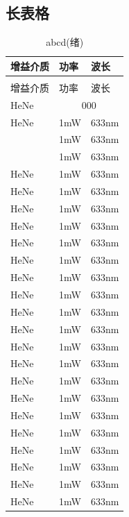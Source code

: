 \documentclass{cumcmthesis}
\begin{document}
\begin{appendices}
\section{长表格}
\begin{longtable}[c]{p{}<{\centering}|p{}<{\centering}p{}<{\centering}}
    \caption{abcd} \\
    \toprule[2pt]
    增益介质&功率& 波长\\ 
    \midrule[1pt]
    \endfirsthead
    \caption[]{abcd(绪)} \\
    \toprule[2pt]
    增益介质&功率&波长\\ 
    \midrule[1pt]
    \endhead
    \bottomrule[1.5pt] 
    \endfoot
    \bottomrule[1.5pt]
    \endlastfoot
    HeNe & \multicolumn{2}{c}{000} \\
    HeNe & 1mW & 633nm \\\cline{1-2} 
    \multirow{2}{0.2\textwidth}{\centering000}
     & 1mW & 633nm \\
     & 1mW & 633nm \\
    HeNe & 1mW & 633nm \\
    HeNe & 1mW & 633nm \\
    HeNe & 1mW &  633nm \\
    HeNe & 1mW & 633nm \\
    HeNe & 1mW & 633nm \\
    HeNe & 1mW & 633nm \\
    HeNe & 1mW & 633nm \\
    HeNe & 1mW & 633nm \\
    HeNe & 1mW & 633nm \\
    HeNe & 1mW & 633nm \\
    HeNe & 1mW & 633nm \\
    HeNe & 1mW & 633nm \\
    HeNe & 1mW & 633nm \\
    HeNe & 1mW & 633nm \\
    HeNe & 1mW & 633nm \\
    HeNe & 1mW & 633nm \\
    HeNe & 1mW & 633nm \\
    HeNe & 1mW & 633nm \\
    HeNe & 1mW & 633nm \\
    HeNe & 1mW & 633nm \\

\end{longtable}
\end{appendices}
\end{document}
